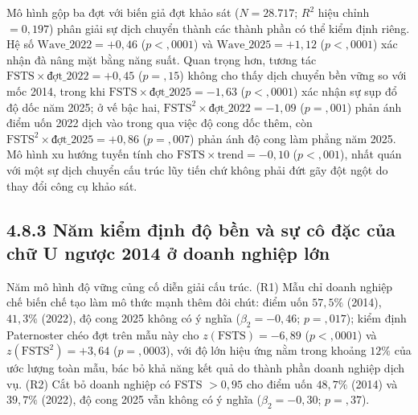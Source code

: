 \documentclass[
  a4paper,
  13pt]{extreport}
\begin{document}
Mô hình gộp ba đợt với biến giả đợt khảo sát (\(N = 28.717\); \(R^2\)
hiệu chỉnh \(= 0{,}197\)) phân giải sự dịch chuyển thành các thành phần
có thể kiểm định riêng. Hệ số \(\text{Wave}\_2022 = +0{,}46\)
(\(p < {,}0001\)) và \(\text{Wave}\_2025 = +1{,}12\) (\(p < {,}0001\))
xác nhận đà nâng mặt bằng năng suất. Quan trọng hơn, tương tác
\(\text{FSTS} \times \text{đợt}\_2022 = +0{,}45\) (\(p = {,}15\)) không
cho thấy dịch chuyển bền vững so với mốc 2014, trong khi
\(\text{FSTS} \times \text{đợt}\_2025 = -1{,}63\) (\(p < {,}0001\)) xác
nhận sự sụp đổ độ dốc năm 2025; ở vế bậc hai,
\(\text{FSTS}^2 \times \text{đợt}\_2022 = -1{,}09\) (\(p = {,}001\))
phản ánh điểm uốn 2022 dịch vào trong qua việc độ cong dốc thêm, còn
\(\text{FSTS}^2 \times \text{đợt}\_2025 = +0{,}86\) (\(p = {,}007\))
phản ánh độ cong làm phẳng năm 2025. Mô hình xu hướng tuyến tính cho
\(\text{FSTS} \times \text{trend} = -0{,}10\) (\(p < {,}001\)), nhất
quán với một sự dịch chuyển cấu trúc lũy tiến chứ không phải đứt gãy đột
ngột do thay đổi công cụ khảo sát.

\hypertarget{nux103m-kiux1ec3m-ux111ux1ecbnh-ux111ux1ed9-bux1ec1n-vuxe0-sux1ef1-cuxf4-ux111ux1eb7c-cux1ee7a-chux1eef-u-ngux1b0ux1ee3c-2014-ux1edf-doanh-nghiux1ec7p-lux1edbn}{%
\subsection{4.8.3 Năm kiểm định độ bền và sự cô đặc của chữ U ngược 2014
ở doanh nghiệp
lớn}\label{nux103m-kiux1ec3m-ux111ux1ecbnh-ux111ux1ed9-bux1ec1n-vuxe0-sux1ef1-cuxf4-ux111ux1eb7c-cux1ee7a-chux1eef-u-ngux1b0ux1ee3c-2014-ux1edf-doanh-nghiux1ec7p-lux1edbn}}

Năm mô hình độ vững củng cố diễn giải cấu trúc. (R1) Mẫu chỉ doanh
nghiệp chế biến chế tạo làm mô thức mạnh thêm đôi chút: điểm uốn
\(57{,}5\%\) (2014), \(41{,}3\%\) (2022), độ cong 2025 không có ý nghĩa
(\(\beta_2 = -0{,}46\); \(p = {,}017\)); kiểm định Paternoster chéo đợt
trên mẫu này cho \(z(\text{FSTS}) = -6{,}89\) (\(p < {,}0001\)) và
\(z(\text{FSTS}^2) = +3{,}64\) (\(p = {,}0003\)), với độ lớn hiệu ứng
nằm trong khoảng \(12\%\) của ước lượng toàn mẫu, bác bỏ khả năng kết
quả do thành phần doanh nghiệp dịch vụ. (R2) Cắt bỏ doanh nghiệp có FSTS
\(> 0{,}95\) cho điểm uốn \(48{,}7\%\) (2014) và \(39{,}7\%\) (2022), độ
cong 2025 vẫn không có ý nghĩa (\(\beta_2 = -0{,}30\); \(p = {,}37\)).
\end{document}
